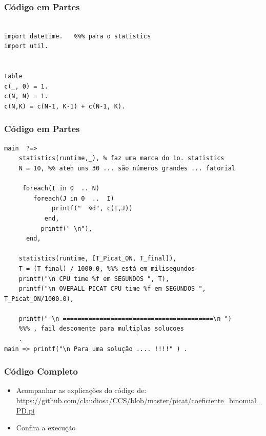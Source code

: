 \begin{frame}[fragile] 

\frametitle{Código em Partes}

\begin{verbatim}

import datetime.   %%% para o statistics
import util.


table
c(_, 0) = 1.
c(N, N) = 1.
c(N,K) = c(N-1, K-1) + c(N-1, K).

\end{verbatim}
    
\end{frame}



\begin{frame}[fragile] 

\frametitle{Código em Partes}


\begin{verbatim}
main  ?=>  
    statistics(runtime,_), % faz uma marca do 1o. statistics
    N = 10, %% ateh uns 30 ... são números grandes ... fatorial

     foreach(I in 0  .. N)
        foreach(J in 0  ..  I)
             printf("  %d", c(I,J))
           end,
          printf(" \n"),
      end, 
   
    statistics(runtime, [T_Picat_ON, T_final]),
    T = (T_final) / 1000.0, %%% está em milisegundos
    printf("\n CPU time %f em SEGUNDOS ", T),
    printf("\n OVERALL PICAT CPU time %f em SEGUNDOS ", T_Picat_ON/1000.0),
    
    printf(" \n =========================================\n ")
    %%% , fail descomente para multiplas solucoes
    .
main => printf("\n Para uma solução .... !!!!" ) .
\end{verbatim}

    
\end{frame}


\begin{frame}[fragile]
 \frametitle{Código Completo}

\begin{itemize}
  \item Acompanhar as explicações do código de:\\
\url{https://github.com/claudiosa/CCS/blob/master/picat/coeficiente_binomial_PD.pi}

  \item Confira a execuç\~ao
\end{itemize}
\end{frame}







